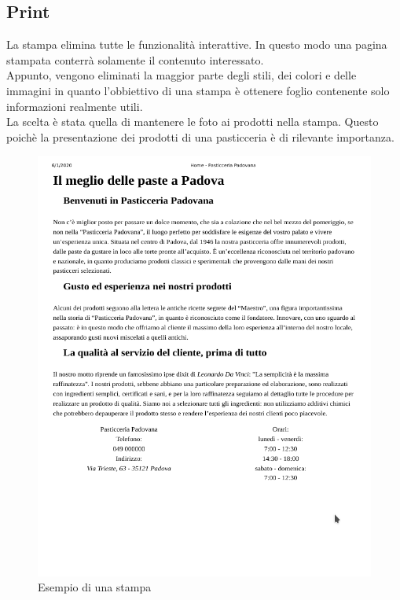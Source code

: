 \subsection{Print}
La stampa elimina tutte le funzionalità interattive. In questo modo una pagina stampata conterrà solamente il contenuto interessato.\\
Appunto, vengono eliminati la maggior parte degli stili, dei colori e delle immagini in quanto l'obbiettivo di una stampa è ottenere foglio 
contenente solo informazioni realmente utili.\\
La scelta è stata quella di mantenere le foto ai prodotti nella stampa. Questo poichè la presentazione dei prodotti di una pasticceria è di rilevante importanza.\\
\begin{figure}[!h]
    \centering		  
	\includegraphics[width=0.8\linewidth]{sezioni/Progettazione/Immagini/print_example.png}
	\caption{Esempio di una stampa}
	\label{Fig:verPrint}
\end{figure}


\newpage